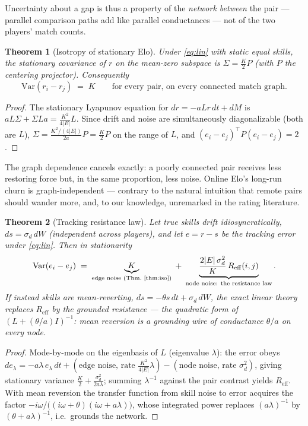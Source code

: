 \documentclass[11pt]{article}
\newtheorem{theorem}{Theorem}
\newcommand{\Reff}{R_{\mathrm{eff}}}
\newcommand{\Var}{\mathrm{Var}}
\begin{document}
Uncertainty about a gap is thus a property of the \emph{network between}
the pair --- parallel comparison paths add like parallel conductances ---
not of the two players' match counts.

\begin{theorem}[Isotropy of stationary Elo]\label{thm:iso}
Under \eqref{eq:lin} with static equal skills, the stationary covariance
of $r$ on the mean-zero subspace is $\Sigma = \tfrac{K}{2} P$ (with $P$
the centering projector). Consequently
\[
\Var(r_i - r_j) \;=\; K \qquad \text{for every pair, on every connected
match graph.}
\]
\end{theorem}

\begin{proof}
The stationary Lyapunov equation for $dr = -aLr\,dt + dM$ is $aL\Sigma +
\Sigma L a = \frac{K^2}{4|E|} L$. Since drift and noise are simultaneously
diagonalizable (both are $L$), $\Sigma = \frac{K^2/(4|E|)}{2a} P =
\frac{K}{2}P$ on the range of $L$, and $(e_i - e_j)^\top P (e_i - e_j) =
2$.
\end{proof}

The graph dependence cancels exactly: a poorly connected pair receives
less restoring force but, in the same proportion, less noise. Online
Elo's long-run churn is graph-independent --- contrary to the natural
intuition that remote pairs should wander more, and, to our knowledge,
unremarked in the rating literature.

\begin{theorem}[Tracking resistance law]\label{thm:track}
Let true skills drift idiosyncratically, $ds = \sigma_d\, dW$ (independent
across players), and let $e = r - s$ be the tracking error under
\eqref{eq:lin}. Then in stationarity
\[
\Var(e_i - e_j) \;=\; \underbrace{K}_{\text{edge noise
(Thm.~\ref{thm:iso})}} \;+\; \underbrace{\frac{2|E|\,\sigma_d^2}{K}\,
\Reff(i,j)}_{\text{node noise: the resistance law}} .
\]
If instead skills are mean-reverting, $ds = -\theta s\,dt + \sigma_d\,dW$,
the exact linear theory replaces $\Reff$ by the \emph{grounded resistance}
--- the quadratic form of $(L + (\theta/a) I)^{-1}$: mean reversion is a
grounding wire of conductance $\theta/a$ on every node.
\end{theorem}

\begin{proof}
Mode-by-mode on the eigenbasis of $L$ (eigenvalue $\lambda$): the error
obeys $de_\lambda = -a\lambda\, e_\lambda\,dt + (\text{edge noise, rate }
\tfrac{K^2}{4|E|}\lambda) - (\text{node noise, rate } \sigma_d^2)$, giving
stationary variance $\frac{K}{2} + \frac{\sigma_d^2}{2a\lambda}$; summing
$\lambda^{-1}$ against the pair contrast yields $\Reff$. With mean
reversion the transfer function from skill noise to error acquires the
factor $-i\omega/\big((i\omega + \theta)(i\omega + a\lambda)\big)$, whose
integrated power replaces $(a\lambda)^{-1}$ by $(\theta +
a\lambda)^{-1}$, i.e.\ grounds the network.
\end{proof}
\end{document}
